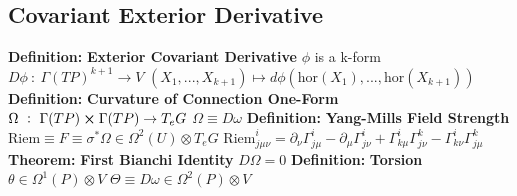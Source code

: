 \documentclass[14pt]{extarticle}
\def\Definition{{\color{blue} \textbf{Definition:} }}
\def\Theorem{{\color{red} \textbf{Theorem:} }}
\begin{document}
\begin{outline}
	\section*{Covariant Exterior Derivative}
		\1	\Definition \textbf{Exterior Covariant Derivative}
			\2	$\phi$ is a k-form
			\2	$D\phi~:~\Gamma(TP)^{k+1} \rightarrow V$
			\2	$(X_1,...,X_{k+1}) \mapsto d\phi(\text{hor}(X_1),...,\text{hor}(X_{k+1}))$
		\1	\Definition \textbf{Curvature of Connection One-Form}
			\2	$\Omega~:~\Gamma(TP) \cross \Gamma(TP) \rightarrow T_eG$
			\2	$\Omega \equiv D\omega$
		\1	\Definition \textbf{Yang-Mills Field Strength}
			\2	$\text{Riem} \equiv F \equiv \sigma^*\Omega \in \Omega^2(U) \otimes T_eG$
			\2	$\text{Riem}^i_{j\mu \nu} = \partial_{\nu}\Gamma^i_{j\mu} -
					\partial_{\mu}\Gamma^i_{j\nu} + \Gamma^i_{k\mu}\Gamma^k_{j\nu} -
					\Gamma^i_{k \nu}\Gamma^k_{j\mu}$
		\1	\Theorem \textbf{First Bianchi Identity}
			\2	$D \Omega = 0$
		\1	\Definition \textbf{Torsion}
			\2	$\theta \in \Omega^1(P) \otimes V$
			\2	$\Theta \equiv D\omega \in \Omega^2(P) \otimes V$
	
	\end{outline}
\end{document}
